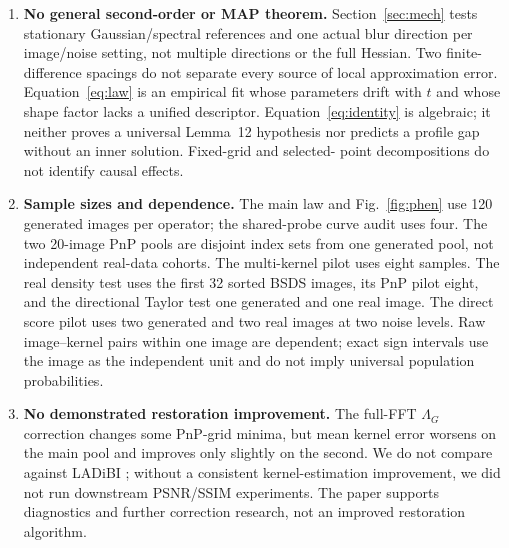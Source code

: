 \documentclass[10pt,journal]{IEEEtran}
\begin{document}
\begin{enumerate}
        generated and two real images at two noise levels. Its 600-step endpoints still have
        nonzero gradients and no global certificate; four-probe replication measures endpoint
        density variability, not optimisation convergence. The $t=\sigma_n$ objective remains
        a smoothed-prior surrogate, and cluster intervals do not include optimisation, model,
        or kernel uncertainty.
  \item \textbf{No general second-order or MAP theorem.} Section~\ref{sec:mech} tests stationary
        Gaussian/spectral references and one actual blur direction per image/noise setting, not
        multiple directions or the full Hessian. Two finite-difference spacings do not separate
        every source of local approximation error. Equation~\eqref{eq:law} is an empirical fit
        whose parameters drift with $t$ and whose shape factor lacks a unified descriptor.
        Equation~\eqref{eq:identity} is algebraic; it neither proves a universal Lemma~12
        hypothesis nor predicts a profile gap without an inner solution. Fixed-grid and selected-
        point decompositions do not identify causal effects.
  \item \textbf{Sample sizes and dependence.} The main law and Fig.~\ref{fig:phen} use 120
        generated images per operator; the shared-probe curve audit uses four. The two 20-image
        PnP pools are disjoint index sets from one generated pool, not independent real-data
        cohorts. The multi-kernel pilot uses eight samples. The real density test uses the first
        32 sorted BSDS images, its PnP pilot eight, and the directional Taylor test one generated
        and one real image. The direct score pilot uses two generated and two real images at two
        noise levels. Raw image--kernel pairs within one image are dependent; exact sign intervals
        use the image as the independent unit and do not imply universal population probabilities.
  \item \textbf{No demonstrated restoration improvement.} The full-FFT $\Lambda_G$ correction
        changes some PnP-grid minima, but mean kernel error worsens on the main pool and improves
        only slightly on the second. We do not compare against LADiBI \cite{bai2026ladibi};
        without a consistent kernel-estimation improvement, we did not run downstream PSNR/SSIM
        experiments. The paper supports diagnostics and further correction research, not an
        improved restoration algorithm.
\end{enumerate}
\end{document}

